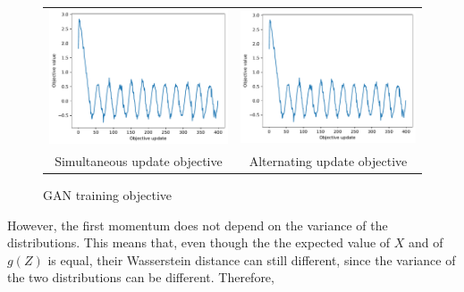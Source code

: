 \documentclass[12pt]{article}
\newcommand{\figw}{7cm}
\begin{document}
\begin{figure}
\centering
\begin{tabular}{cc}
  \includegraphics[width=\figw]{hw2/codes/gan/plots/simultaneous/simultaneous_objectives.pdf} &   \includegraphics[width=\figw]{hw2/codes/gan/plots/simultaneous/simultaneous_objectives.pdf} \\
Simultaneous update objective & Alternating update objective \\[6pt]
\end{tabular}
\caption{GAN training objective} \label{fig:objectives}
\end{figure}

However, the first momentum does not depend on the variance of the distributions. This means that, even though the the expected value of $X$ and of $g(Z)$ is equal, their Wasserstein distance can still different, since the variance of the two distributions can be different. Therefore, 
\end{document}
